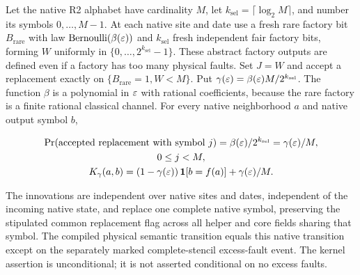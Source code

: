 \begin{lemma}\label{q1:l17}

Let the native R2 alphabet have cardinality \(M\), let \(k_{\mathrm{sel}}=\lceil \log _{2} M\rceil\), and number its symbols \(0,\dots,M-1\). At each native site and date use a fresh rare factory bit \(B_{\mathrm{rare}}\) with law \(\mathrm{Bernoulli}(\beta(\varepsilon))\) and \(k_{\mathrm{sel}}\) fresh independent fair factory bits, forming \(W\) uniformly in \(\{0,\dots,2^{k_{\mathrm{sel}}}-1\}\). These abstract factory outputs are defined even if a factory has too many physical faults. Set \(J=W\) and accept a replacement exactly on \(\{B_{\mathrm{rare}}=1,W<M\}\). Put \(\gamma(\varepsilon)=\beta(\varepsilon) M/2^{k_{\mathrm{sel}}}\). The function \(\beta\) is a polynomial in \(\varepsilon\) with rational coefficients, because the rare factory is a finite rational classical channel. For every native neighborhood \(a\) and native output symbol \(b\),

\[
\begin{gathered}
\Pr(\text{accepted replacement with symbol }j) = \beta(\varepsilon)/2^{k_{\mathrm{sel}}} = \gamma(\varepsilon)/M, \\ 0 \le  j < M, \\ K_{\gamma}(a,b) = (1-\gamma(\varepsilon))\, \mathbf 1[b=f(a)] + \gamma(\varepsilon)/M.
\end{gathered}
\]

The innovations are independent over native sites and dates, independent of the incoming native state, and replace one complete native symbol, preserving the stipulated common replacement flag across all helper and core fields sharing that symbol. The compiled physical semantic transition equals this native transition except on the separately marked complete-stencil excess-fault event. The kernel assertion is unconditional; it is not asserted conditional on no excess faults.

\end{lemma}
